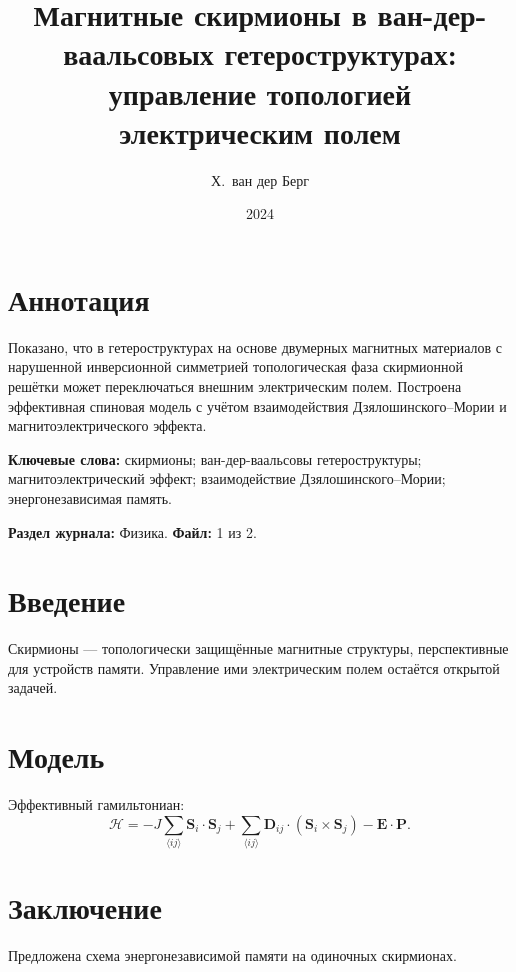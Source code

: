 \documentclass[12pt]{article}
\title{Магнитные скирмионы в ван-дер-ваальсовых гетероструктурах:\\ управление топологией электрическим полем}
\author{Х.~ван дер Берг}
\date{2024}
\begin{document}
\maketitle

\section*{Аннотация}
Показано, что в гетероструктурах на основе двумерных магнитных материалов с нарушенной инверсионной симметрией топологическая фаза скирмионной решётки может переключаться внешним электрическим полем. Построена эффективная спиновая модель с учётом взаимодействия Дзялошинского–Мории и магнитоэлектрического эффекта.

\vspace{0.5cm}
\noindent\textbf{Ключевые слова:} скирмионы; ван-дер-ваальсовы гетероструктуры; магнитоэлектрический эффект; взаимодействие Дзялошинского–Мории; энергонезависимая память.

\vspace{0.3cm}
\noindent\textbf{Раздел журнала:} Физика. \quad \textbf{Файл:} 1 из 2.

\section{Введение}
Скирмионы — топологически защищённые магнитные структуры, перспективные для устройств памяти. Управление ими электрическим полем остаётся открытой задачей.

\section{Модель}
Эффективный гамильтониан:
\begin{equation}
\mathcal{H} = -J \sum_{\langle ij \rangle} \mathbf{S}_i \cdot \mathbf{S}_j + \sum_{\langle ij \rangle} \mathbf{D}_{ij} \cdot (\mathbf{S}_i \times \mathbf{S}_j) - \mathbf{E} \cdot \mathbf{P}.
\end{equation}

\section{Заключение}
Предложена схема энергонезависимой памяти на одиночных скирмионах.
\end{document}
